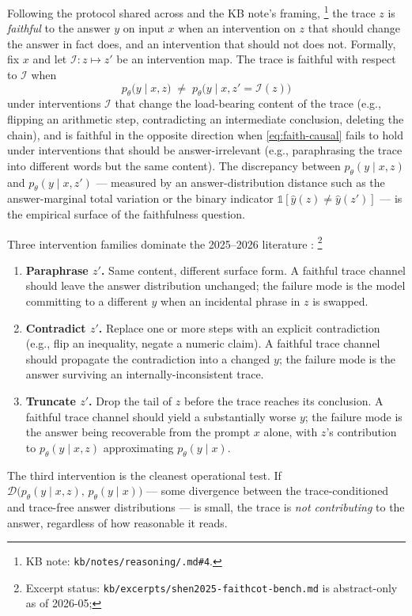 Following the protocol shared across
\citet{arcuschin2025-cot-wild,shen2025-faithcot-bench,
mehta2026-faithfulness-scaling} and the KB note's framing,%
\footnote{KB note:
\texttt{kb/notes/reasoning/.md\#4}.} the trace $z$ is
\emph{faithful} to the answer $y$ on input $x$ when an intervention on
$z$ that should change the answer in fact does, and an intervention
that should not does not. Formally, fix $x$ and let
$\mathcal{I}: z \mapsto z'$ be an intervention map. The trace is
faithful with respect to $\mathcal{I}$ when
\begin{equation}
  p_\theta\!\bigl(y \mid x, z\bigr) \;\neq\; p_\theta\!\bigl(y \mid x, z' = \mathcal{I}(z)\bigr)
  \label{eq:faith-causal}
\end{equation}
under interventions $\mathcal{I}$ that change the load-bearing content
of the trace (e.g., flipping an arithmetic step, contradicting an
intermediate conclusion, deleting the chain), and is faithful in the
opposite direction when \cref{eq:faith-causal} fails to hold under
interventions that should be answer-irrelevant (e.g., paraphrasing the
trace into different words but the same content). The discrepancy
between $p_\theta(y \mid x, z)$ and $p_\theta(y \mid x, z')$ — measured
by an answer-distribution distance such as the answer-marginal total
variation or the binary indicator $\mathbb{1}[\hat y(z) \neq \hat y(z')]$
— is the empirical surface of the faithfulness question.

Three intervention families dominate the 2025--2026 literature
\citep[\S 3]{shen2025-faithcot-bench}:%
\footnote{Excerpt status:
\texttt{kb/excerpts/shen2025-faithcot-bench.md} is abstract-only as of
2026-05; }
\begin{enumerate}
\item \textbf{Paraphrase $z'$.} Same content, different surface form. A
faithful trace channel should leave the answer distribution unchanged;
the failure mode is the model committing to a different $y$ when an
incidental phrase in $z$ is swapped.
\item \textbf{Contradict $z'$.} Replace one or more steps with an
explicit contradiction (e.g., flip an inequality, negate a numeric
claim). A faithful trace channel should propagate the contradiction
into a changed $y$; the failure mode is the answer surviving an
internally-inconsistent trace.
\item \textbf{Truncate $z'$.} Drop the tail of $z$ before the trace
reaches its conclusion. A faithful trace channel should yield a
substantially worse $y$; the failure mode is the answer being recoverable
from the prompt $x$ alone, with $z$'s contribution to $p_\theta(y \mid
x, z)$ approximating $p_\theta(y \mid x)$.
\end{enumerate}
The third intervention is the cleanest operational test. If
$\mathcal{D}\!\bigl(p_\theta(y \mid x, z),\, p_\theta(y \mid x)\bigr)$
— some divergence between the trace-conditioned and trace-free answer
distributions — is small, the trace is \emph{not contributing} to the
answer, regardless of how reasonable it reads.

